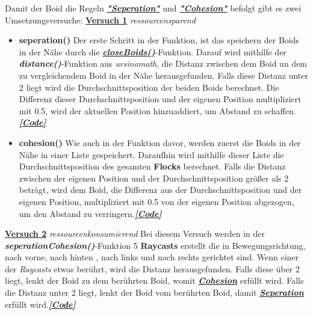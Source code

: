 \documentclass[a4paper, hidelinks, 12pt]{article}
\begin{document}
Damit der Boid die Regeln \hyperref[sec:Seperation]{\textbf{\emph{"Seperation"}}} und \hyperref[sec:Cohesion]{\textbf{\emph{"Cohesion"}}} befolgt gibt es zwei Umsetzungsversuche:\newline\newline
\underline{\textbf{Versuch 1}} \emph{ressourcensparend}
\begin{itemize}
	\item \textbf{seperation()}\label{sec:seperation}\newline
	Der erste Schritt in der Funktion, ist das speichern der Boids in der Nähe durch die \hyperref[sec:closeBoids]{\textbf{\emph{closeBoids()}}}-Funktion. Darauf wird mithilfe der \textbf{\emph{distance()}}-Funktion aus \emph{ursinamath}, die Distanz\cite{distance} zwischen dem Boid un dem zu vergleichendem Boid in der Nähe herausgefunden. Falls diese Distanz unter 2 liegt wird die Durchschnittsposition der beiden Boids berechnet. Die Differenz dieser Durchschnittsposition und der eigenen Position multipliziert mit 0.5, wird der aktuellen Position hinzuaddiert, um Abstand zu schaffen.\hyperref[Codeseperation]{\textbf{\emph{[Code]}}}
	\item \textbf{cohesion()}\label{sec:cohesion}\newline
	Wie auch in der Funktion davor, werden zuerst die Boids in der Nähe in einer Liste gespeichert. Daraufhin wird mithilfe dieser Liste die Durchschnittsposition des gesamten \textbf{Flocks} berechnet. Falls die Distanz\cite{distance} zwischen der eigenen Position und der Durchschnittsposition größer als 2 beträgt, wird dem Boid, die Differenz aus der Durchschnittsposition und der eigenen Position, multipliziert mit 0.5 von der eigenen Position abgezogen, um den Abstand zu verringern.\hyperref[Codecohesion]{\textbf{\emph{[Code]}}}
\end{itemize}

\underline{\textbf{Versuch 2}} \emph{ressourcenkonsumierend}\label{sec:seperationCohesion}
Bei diesem Versuch werden in der \textbf{\emph{seperationCohesion()}}-Funktion 5 \textbf{Raycasts} erstellt die in Bewegungsrichtung, nach vorne, nach hinten , nach links und nach rechts gerichtet sind. Wenn einer der \emph{Raycasts}\cite{raycast} etwas berührt, wird die Distanz\cite{HitInfo} herausgefunden. Falls diese über 2 liegt, lenkt der Boid zu dem berührten Boid, womit \hyperref[sec:Cohesion]{\textbf{\emph{Cohesion}}} erfüllt wird. Falls die Distanz unter 2 liegt, lenkt der Boid vom berührten Boid, damit \hyperref[sec:Seperation]{\textbf{\emph{Seperation}}} erfüllt wird.\hyperref[CodeseperationCohesion]{\textbf{\emph{[Code]}}}
\end{document}
